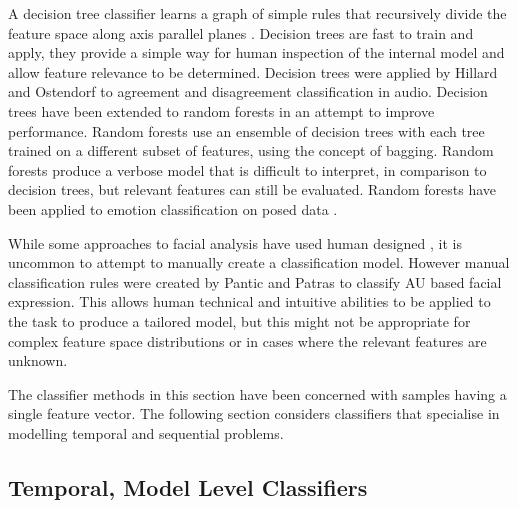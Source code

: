 A decision tree classifier learns a graph of simple rules that recursively divide the feature space along axis parallel planes \cite{Breiman1984}. Decision trees are fast to train and apply, they provide a simple way for human inspection of the internal model and allow feature relevance to be determined. Decision trees were applied by Hillard and Ostendorf \cite{Hillard03} to agreement and disagreement classification in audio. Decision trees have been extended to random forests \cite{Breiman2001} in an attempt to improve performance. Random forests use an ensemble of decision trees with each tree trained on a different subset of features, using the concept of bagging. Random forests produce a verbose model that is difficult to interpret, in comparison to decision trees, but relevant features can still be evaluated. Random forests have been applied to emotion classification on posed data \cite{Fanelli2010}.


While some approaches to facial analysis have used human designed \featureGeneration, it is uncommon to attempt to manually create a classification model. However manual classification rules were created by Pantic and Patras \cite{Pantic2006} to classify \ac{AU} based facial expression. This allows human technical and intuitive abilities to be applied to the task to produce a tailored model, but this might not be appropriate for complex feature space distributions or in cases where the relevant features are unknown.

The classifier methods in this section have been concerned with samples having a single feature vector. The following section considers classifiers that specialise in modelling temporal and sequential problems.

\subsection{Temporal, Model Level Classifiers}

